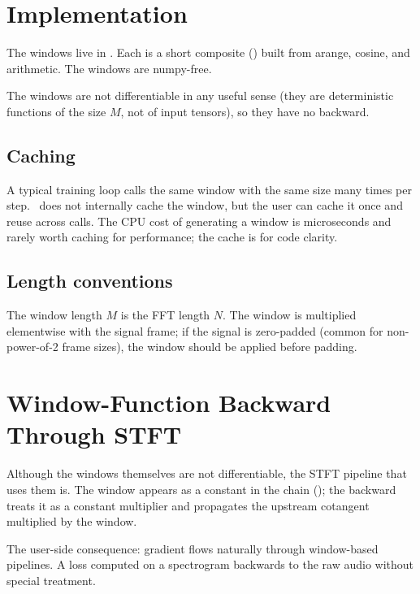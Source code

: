 \section{Implementation}
\label{sec:signal_windows:implementation}

The windows live in . Each is a
short composite () built from arange,
cosine, and arithmetic. The windows are numpy-free.

The windows are not differentiable in any useful sense (they
are deterministic functions of the size $M$, not of input
tensors), so they have no backward.

\subsection{Caching}
\label{ssec:signal_windows:caching}

A typical training loop calls the same window with the same size
many times per step. \Lucid\ does not internally cache the
window, but the user can cache it once and reuse across calls.
The CPU cost of generating a window is microseconds and rarely
worth caching for performance; the cache is for code clarity.

\subsection{Length conventions}
\label{ssec:signal_windows:length}

The window length $M$ is the FFT length $N$. The window is
multiplied elementwise with the signal frame; if the signal is
zero-padded (common for non-power-of-2 frame sizes), the window
should be applied before padding.

\section{Window-Function Backward Through STFT}
\label{sec:signal_windows:stft_backward}

Although the windows themselves are not differentiable, the
STFT pipeline that uses them is. The window appears as a
constant in the chain (); the backward
treats it as a constant multiplier and propagates the upstream
cotangent multiplied by the window.

The user-side consequence: gradient flows naturally through
window-based pipelines. A loss computed on a spectrogram
backwards to the raw audio without special treatment.

